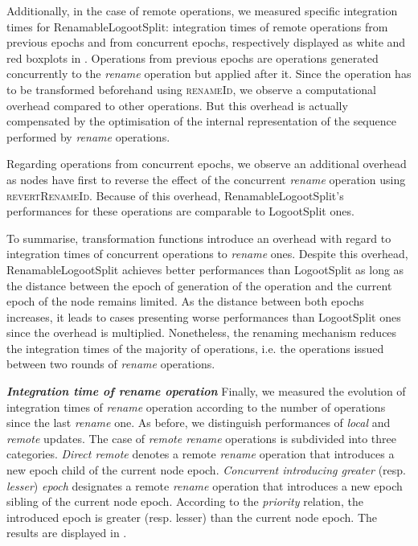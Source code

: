 \documentclass[10pt,journal,compsoc]{IEEEtran}
\newcommand{\ie}{i.e. }
\newcommand{\headerparagraph}[1]{\textbf{\emph{#1}}\quad}
\begin{document}
Additionally, in the case of remote operations, we measured specific integration times for RenamableLogootSplit: integration times of remote operations from previous epochs and from concurrent epochs, respectively displayed as white and red boxplots in .
Operations from previous epochs are operations generated concurrently to the \emph{rename} operation but applied after it.
Since the operation has to be transformed beforehand using \textsc{renameId}, we observe a computational overhead compared to other operations.
But this overhead is actually compensated by the optimisation of the internal representation of the sequence performed by \emph{rename} operations.

Regarding operations from concurrent epochs, we observe an additional overhead as nodes have first to reverse the effect of the concurrent \emph{rename} operation using \textsc{revertRenameId}.
Because of this overhead, RenamableLogootSplit's performances for these operations are comparable to LogootSplit ones.

To summarise, transformation functions introduce an overhead with regard to integration times of concurrent operations to \emph{rename} ones.
Despite this overhead, RenamableLogootSplit achieves better performances than LogootSplit as long as the distance between the epoch of generation of the operation and the current epoch of the node remains limited.
As the distance between both epochs increases, it leads to cases presenting worse performances than LogootSplit ones since the overhead is multiplied.
Nonetheless, the renaming mechanism reduces the integration times of the majority of operations, \ie the operations issued between two rounds of \emph{rename} operations.

\headerparagraph{Integration time of \emph{rename} operation}
%
Finally, we measured the evolution of integration times of \emph{rename} operation according to the number of operations since the last \emph{rename} one.
As before, we distinguish performances of \emph{local} and \emph{remote} updates.
The case of \emph{remote rename} operations is subdivided into three categories.
\emph{Direct remote} denotes a remote \emph{rename} operation that introduces a new epoch child of the current node epoch.
\emph{Concurrent introducing greater} (resp. \emph{lesser}) \emph{epoch} designates a remote \emph{rename} operation that introduces a new epoch sibling of the current node epoch.
According to the \emph{priority} relation, the introduced epoch is greater (resp. lesser) than the current node epoch.
The results are displayed in .
\end{document}
